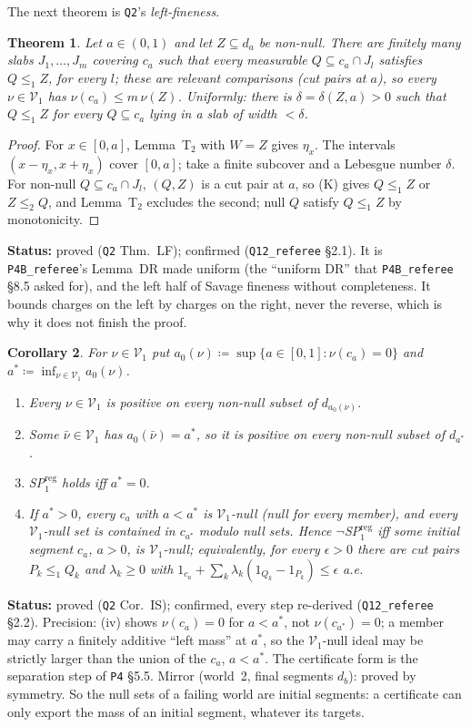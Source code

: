 \documentclass[11pt]{article}
\newtheorem{theorem}{Theorem}[section]
\newtheorem{corollary}[theorem]{Corollary}
\theoremstyle{definition}
\theoremstyle{remark}
\newcommand{\src}[1]{\texttt{#1}}
\newcommand{\status}[1]{\par\smallskip\noindent\textbf{Status:} #1\par\smallskip}
\begin{document}
The next theorem is \src{Q2}'s \emph{left-fineness}.

\begin{theorem}\label{thm:LF}
Let $a\in(0,1)$ and let $Z\subseteq d_a$ be non-null. There are finitely many slabs $J_1,\dots,J_m$ covering $c_a$ such that every measurable $Q\subseteq c_a\cap J_l$ satisfies $Q\le_1Z$, for every $l$; these are relevant comparisons (cut pairs at $a$), so every $\nu\in\mathcal V_1$ has $\nu(c_a)\le m\,\nu(Z)$. Uniformly: there is $\delta=\delta(Z,a)>0$ such that $Q\le_1Z$ for every $Q\subseteq c_a$ lying in a slab of width $<\delta$.
\end{theorem}
\begin{proof}
For $x\in[0,a]$, Lemma~T$_2$ with $W=Z$ gives $\eta_x$. The intervals $(x-\eta_x,x+\eta_x)$ cover $[0,a]$; take a finite subcover and a Lebesgue number $\delta$. For non-null $Q\subseteq c_a\cap J_l$, $(Q,Z)$ is a cut pair at $a$, so (K) gives $Q\le_1Z$ or $Z\le_2Q$, and Lemma~T$_2$ excludes the second; null $Q$ satisfy $Q\le_1Z$ by monotonicity.
\end{proof}
\status{proved (\src{Q2} Thm.~LF); confirmed (\src{Q12\_referee} \S2.1). It is \src{P4B\_referee}'s Lemma~DR made uniform (the ``uniform DR'' that \src{P4B\_referee} \S8.5 asked for), and the left half of Savage fineness without completeness. It bounds charges on the left by charges on the right, never the reverse, which is why it does not finish the proof.}

\begin{corollary}\label{cor:IS}
For $\nu\in\mathcal V_1$ put $a_0(\nu)\coloneqq\sup\{a\in[0,1]:\nu(c_a)=0\}$ and $a^*\coloneqq\inf_{\nu\in\mathcal V_1}a_0(\nu)$.
\begin{enumerate}[leftmargin=*,label=(\roman*)]
\item Every $\nu\in\mathcal V_1$ is positive on every non-null subset of $d_{a_0(\nu)}$.
\item Some $\bar\nu\in\mathcal V_1$ has $a_0(\bar\nu)=a^*$, so it is positive on every non-null subset of $d_{a^*}$.
\item SP$^{\mathrm{reg}}_1$ holds iff $a^*=0$.
\item If $a^*>0$, every $c_a$ with $a<a^*$ is $\mathcal V_1$-null (null for every member), and every $\mathcal V_1$-null set is contained in $c_{a^*}$ modulo null sets. Hence $\neg$SP$^{\mathrm{reg}}_1$ iff some initial segment $c_a$, $a>0$, is $\mathcal V_1$-null; equivalently, for every $\epsilon>0$ there are cut pairs $P_k\le_1Q_k$ and $\lambda_k\ge0$ with $1_{c_a}+\sum_k\lambda_k(1_{Q_k}-1_{P_k})\le\epsilon$ a.e.
\end{enumerate}
\end{corollary}
\status{proved (\src{Q2} Cor.~IS); confirmed, every step re-derived (\src{Q12\_referee} \S2.2). Precision: (iv) shows $\nu(c_a)=0$ for $a<a^*$, not $\nu(c_{a^*})=0$; a member may carry a finitely additive ``left mass'' at $a^*$, so the $\mathcal V_1$-null ideal may be strictly larger than the union of the $c_a$, $a<a^*$. The certificate form is the separation step of \src{P4} \S5.5. Mirror (world~2, final segments $d_b$): proved by symmetry. So the null sets of a failing world are initial segments: a certificate can only export the mass of an initial segment, whatever its targets.}
\end{document}
